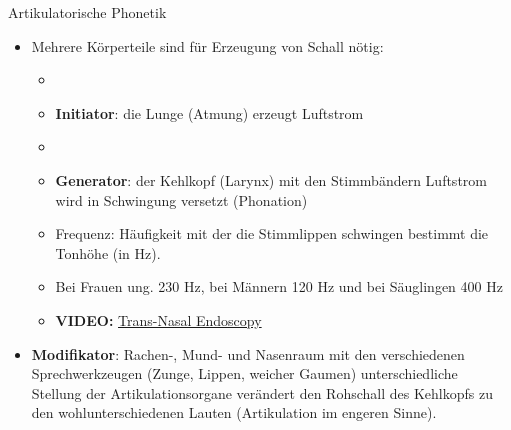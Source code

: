 \begin{frame}{Artikulatorische Phonetik}

	\begin{itemize}
		\item Mehrere Körperteile sind für Erzeugung von Schall nötig:
		
		\begin{itemize}
			\item[]
			\item \textbf{Initiator}: die Lunge \ras (Atmung) erzeugt Luftstrom
			\item[]
			\item \textbf{Generator}: der Kehlkopf (Larynx) mit den Stimmbändern \ras Luftstrom wird in Schwingung versetzt (Phonation)
		\end{itemize}
		
		\begin{itemize}
			\item[] Frequenz: Häufigkeit mit der die Stimmlippen schwingen bestimmt die Tonhöhe (in Hz).
			\item[]

			\ea Bei Frauen ung. 230 Hz, bei Männern 120 Hz und bei Säuglingen 400 Hz
			\z

		\end{itemize}
		
		\begin{itemize}
			\item[] \textbf{VIDEO:} \href{run:material/04TransNasalEndoscopy.mp4}{Trans-Nasal Endoscopy}
		\end{itemize}
		
	\end{itemize}
	
\end{frame}



\begin{frame}

	\begin{itemize}
		\item \textbf{Modifikator}: Rachen-, Mund- und Nasenraum mit den verschiedenen Sprechwerkzeugen (Zunge, Lippen, weicher Gaumen) \ras unterschiedliche Stellung der Artikulationsorgane verändert den Rohschall des Kehlkopfs zu den wohlunterschiedenen Lauten (Artikulation im engeren Sinne).
	\end{itemize}
	
\end{frame}



